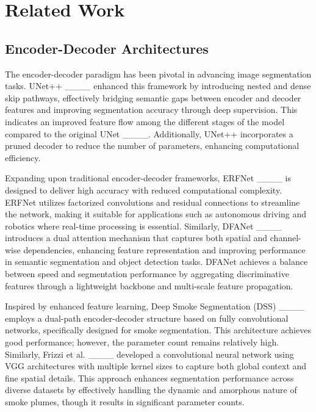 \section{Related Work}
\subsection{Encoder-Decoder Architectures}

The encoder-decoder paradigm has been pivotal in advancing image segmentation tasks. UNet++ ____ enhanced this framework by introducing nested and dense skip pathways, effectively bridging semantic gaps between encoder and decoder features and improving segmentation accuracy through deep supervision. This indicates an improved feature flow among the different stages of the model compared to the original UNet ____. Additionally, UNet++ incorporates a pruned decoder to reduce the number of parameters, enhancing computational efficiency.

Expanding upon traditional encoder-decoder frameworks, ERFNet ____ is designed to deliver high accuracy with reduced computational complexity. ERFNet utilizes factorized convolutions and residual connections to streamline the network, making it suitable for applications such as autonomous driving and robotics where real-time processing is essential. Similarly, DFANet ____ introduces a dual attention mechanism that captures both spatial and channel-wise dependencies, enhancing feature representation and improving performance in semantic segmentation and object detection tasks. DFANet achieves a balance between speed and segmentation performance by aggregating discriminative features through a lightweight backbone and multi-scale feature propagation.

Inspired by enhanced feature learning, Deep Smoke Segmentation (DSS) ____ employs a dual-path encoder-decoder structure based on fully convolutional networks, specifically designed for smoke segmentation. This architecture achieves good performance; however, the parameter count remains relatively high. Similarly, Frizzi et al. ____ developed a convolutional neural network using VGG architectures with multiple kernel sizes to capture both global context and fine spatial details. This approach enhances segmentation performance across diverse datasets by effectively handling the dynamic and amorphous nature of smoke plumes, though it results in significant parameter counts.

